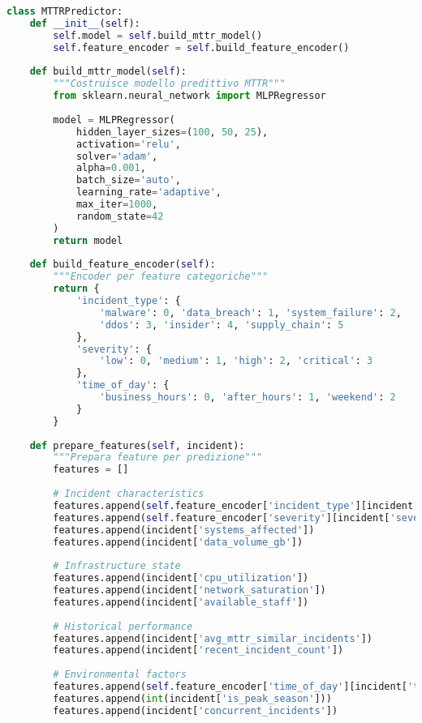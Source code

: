 \begin{lstlisting}[language=Python, caption=Predizione MTTR per Incident Response]
class MTTRPredictor:
    def __init__(self):
        self.model = self.build_mttr_model()
        self.feature_encoder = self.build_feature_encoder()
        
    def build_mttr_model(self):
        """Costruisce modello predittivo MTTR"""
        from sklearn.neural_network import MLPRegressor
        
        model = MLPRegressor(
            hidden_layer_sizes=(100, 50, 25),
            activation='relu',
            solver='adam',
            alpha=0.001,
            batch_size='auto',
            learning_rate='adaptive',
            max_iter=1000,
            random_state=42
        )
        return model
    
    def build_feature_encoder(self):
        """Encoder per feature categoriche"""
        return {
            'incident_type': {
                'malware': 0, 'data_breach': 1, 'system_failure': 2,
                'ddos': 3, 'insider': 4, 'supply_chain': 5
            },
            'severity': {
                'low': 0, 'medium': 1, 'high': 2, 'critical': 3
            },
            'time_of_day': {
                'business_hours': 0, 'after_hours': 1, 'weekend': 2
            }
        }
    
    def prepare_features(self, incident):
        """Prepara feature per predizione"""
        features = []
        
        # Incident characteristics
        features.append(self.feature_encoder['incident_type'][incident['type']])
        features.append(self.feature_encoder['severity'][incident['severity']])
        features.append(incident['systems_affected'])
        features.append(incident['data_volume_gb'])
        
        # Infrastructure state
        features.append(incident['cpu_utilization'])
        features.append(incident['network_saturation'])
        features.append(incident['available_staff'])
        
        # Historical performance
        features.append(incident['avg_mttr_similar_incidents'])
        features.append(incident['recent_incident_count'])
        
        # Environmental factors
        features.append(self.feature_encoder['time_of_day'][incident['time_category']])
        features.append(int(incident['is_peak_season']))
        features.append(incident['concurrent_incidents'])
        

\end{lstlisting}

